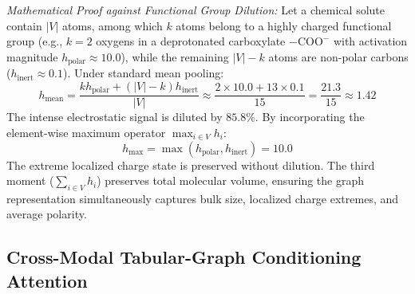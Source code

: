 \documentclass[11pt]{article}
\begin{document}
\noindent\textit{Mathematical Proof against Functional Group Dilution:} Let a chemical solute contain $|V|$ atoms, among which $k$ atoms belong to a highly charged functional group (e.g., $k = 2$ oxygens in a deprotonated carboxylate $-\mathrm{COO}^-$ with activation magnitude $h_{\mathrm{polar}} \approx 10.0$), while the remaining $|V| - k$ atoms are non-polar carbons ($h_{\mathrm{inert}} \approx 0.1$). 
Under standard mean pooling:
\begin{equation}
h_{\mathrm{mean}} = \frac{k h_{\mathrm{polar}} + (|V| - k) h_{\mathrm{inert}}}{|V|} \approx \frac{2 \times 10.0 + 13 \times 0.1}{15} = \frac{21.3}{15} \approx 1.42
\end{equation}
The intense electrostatic signal is diluted by $85.8\%$. By incorporating the element-wise maximum operator $\max_{i \in V} h_i$:
\begin{equation}
h_{\mathrm{max}} = \max\left( h_{\mathrm{polar}}, h_{\mathrm{inert}} \right) = 10.0
\end{equation}
The extreme localized charge state is preserved without dilution. The third moment ($\sum_{i \in V} h_i$) preserves total molecular volume, ensuring the graph representation simultaneously captures bulk size, localized charge extremes, and average polarity.

\subsection{Cross-Modal Tabular-Graph Conditioning Attention}
\label{sec:cross_modal_attention}
\end{document}
